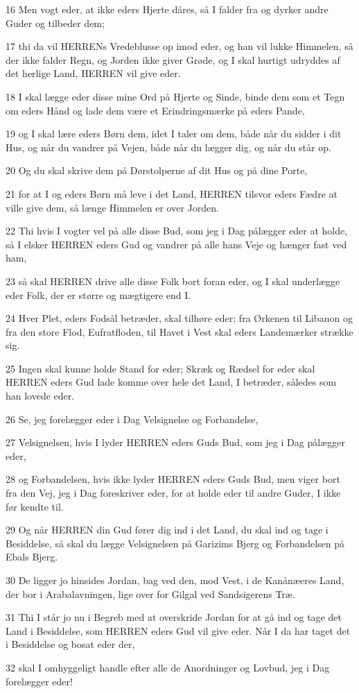 \par 16 Men vogt eder, at ikke eders Hjerte dåres, så I falder fra og dyrker andre Guder og tilbeder dem;
\par 17 thi da vil HERRENs Vredeblusse op imod eder, og han vil lukke Himmelen, så der ikke falder Regn, og Jorden ikke giver Grøde, og I skal hurtigt udryddes af det herlige Land, HERREN vil give eder.
\par 18 I skal lægge eder disse mine Ord på Hjerte og Sinde, binde dem som et Tegn om eders Hånd og lade dem være et Erindringsmærke på eders Pande,
\par 19 og I skal lære eders Børn dem, idet I taler om dem, både når du sidder i dit Hus, og når du vandrer på Vejen, både når du lægger dig, og når du står op.
\par 20 Og du skal skrive dem på Dørstolperne af dit Hus og på dine Porte,
\par 21 for at I og eders Børn må leve i det Land, HERREN tilsvor eders Fædre at ville give dem, så længe Himmelen er over Jorden.
\par 22 Thi hvis I vogter vel på alle disse Bud, som jeg i Dag pålægger eder at holde, så I elsker HERREN eders Gud og vandrer på alle hans Veje og hænger fast ved ham,
\par 23 så skal HERREN drive alle disse Folk bort foran eder, og I skal underlægge eder Folk, der er større og mægtigere end I.
\par 24 Hver Plet, eders Fodsål betræder, skal tilhøre eder; fra Ørkenen til Libanon og fra den store Flod, Eufratfloden, til Havet i Vest skal eders Landemærker strække sig.
\par 25 Ingen skal kunne holde Stand for eder; Skræk og Rædsel for eder skal HERREN eders Gud lade komme over hele det Land, I betræder, således som han lovede eder.
\par 26 Se, jeg forelægger eder i Dag Velsignelse og Forbandelse,
\par 27 Velsignelsen, hvis I lyder HERREN eders Guds Bud, som jeg i Dag pålægger eder,
\par 28 og Forbandelsen, hvis ikke lyder HERREN eders Guds Bud, men viger bort fra den Vej, jeg i Dag foreskriver eder, for at holde eder til andre Guder, I ikke før kendte til.
\par 29 Og når HERREN din Gud fører dig ind i det Land, du skal ind og tage i Besiddelse, så skal du lægge Velsignelsen på Garizims Bjerg og Forbandelsen på Ebals Bjerg.
\par 30 De ligger jo hinsides Jordan, bag ved den, mod Vest, i de Kanånæeres Land, der bor i Arabalavningen, lige over for Gilgal ved Sandsigerens Træ.
\par 31 Thi I står jo nu i Begreb med at overskride Jordan for at gå ind og tage det Land i Besiddelse, som HERREN eders Gud vil give eder. Når I da har taget det i Besiddelse og bosat eder der,
\par 32 skal I omhyggeligt handle efter alle de Anordninger og Lovbud, jeg i Dag forelægger eder!

